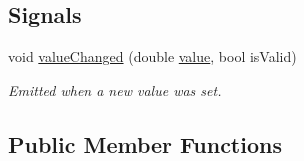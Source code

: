 \subsection*{Signals}
\begin{DoxyCompactItemize}
\item 
void \hyperlink{classmdt_double_edit_a04275f70dcfa22b677841a108dde2561}{value\-Changed} (double \hyperlink{classmdt_double_edit_a6987992984d3cfab5f96467c2b98e511}{value}, bool is\-Valid)
\begin{DoxyCompactList}\small\item\em Emitted when a new value was set. \end{DoxyCompactList}\end{DoxyCompactItemize}
\subsection*{Public Member Functions}
